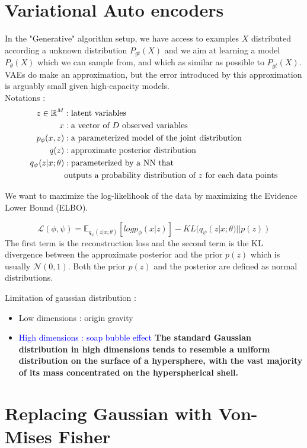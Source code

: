 \documentclass[12pt]{article}
\newcommand{\RR}{\mathbb{R}} %
\newcommand{\EE}{\mathbb{E}} %
\begin{document}
\section{Variational Auto encoders}
In the "Generative" algorithm setup, we have access to examples $X$ distributed according a unknown distribution $P_{gt}(X)$ and we aim at learning a model $P_{\theta}(X)$ which we can sample from, and 
which as similar as possible to $P_{gt}(X)$. \\
VAEs do make an approximation, but the error introduced by this approximation is arguably small given high-capacity models. \\ 

Notations :
\begin{align*}
    z\in\RR^M &: \textrm{latent variables} \\
    x &: \textmd{a vector of $D$ observed variables} \\
    p_\phi(x, z) &: \textrm{a parameterized model of the joint distribution}\\
    q(z) &: \textrm{approximate posterior distribution} \\
    q_\psi(z|x;\theta) &: \textrm{parameterized by a NN that}\\ 
    &\textrm{outputs a probability distribution of $z$ for each data points}
\end{align*}

We want to maximize the log-likelihook of the data by maximizing the Evidence Lower Bound (ELBO).

$$
\mathcal{L}(\phi, \psi) = \EE_{q_{\psi}(z|x; \theta)}[log p_{\phi}(x|z)] - KL(q_{\psi}(z|x;\theta) || p(z))
$$
The first term is the reconstruction loss and the second term is the KL divergence between the approximate posterior and the prior $p(z)$ which is usually $\mathcal{N}(0, 1)$.
Both the prior $p(z)$ and the posterior are defined as normal distributions.

Limitation of gaussian distribution :
\begin{itemize}
    \item Low dimensions : origin gravity
    \item \textcolor{blue}{High dimensions : soap bubble effect}
        \textbf{The standard Gaussian distribution in high dimensions tends to resemble a uniform distribution on the surface of a hypersphere, with the vast majority of its mass concentrated on the hyperspherical shell.}
\end{itemize}

\section{Replacing Gaussian with Von-Mises Fisher}
\end{document}
